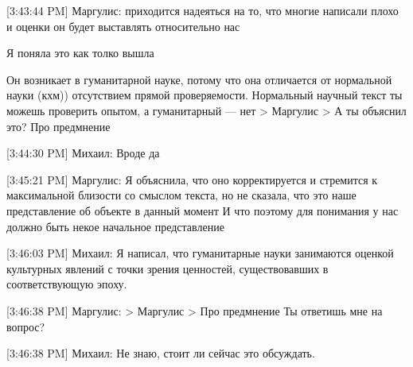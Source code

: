 \documentclass{article}
\begin{document}
[3:43:44 PM] Маргулис:
{приходится надеяться на то, что многие написали плохо и оценки он будет выставлять относительно нас} 


Я поняла это как толко вышла 

Он возникает в гуманитарной науке, потому что она отличается от нормальной науки (кхм)) отсутствием прямой проверяемости. Нормальный научный текст ты можешь проверить опытом, а гуманитарный — нет
> Маргулис
> А ты объяснил это?
Про предмнение

[3:44:30 PM] Михаил:
Вроде да

[3:45:21 PM] Маргулис:
Я объяснила, что оно корректируется и стремится к максимальной близости со смыслом текста, но не сказала, что это наше представление об объекте в данный момент
 И что поэтому для понимания у нас должно быть некое начальное представление

[3:46:03 PM] Михаил:
Я написал, что гуманитарные науки занимаются оценкой культурных явлений с точки зрения ценностей, существовавших в соответствующую эпоху.

[3:46:38 PM] Маргулис:
> Маргулис
> Про предмнение
Ты ответишь мне на вопрос?

[3:46:38 PM] Михаил:
Не знаю, стоит ли сейчас это обсуждать.
\end{document}

